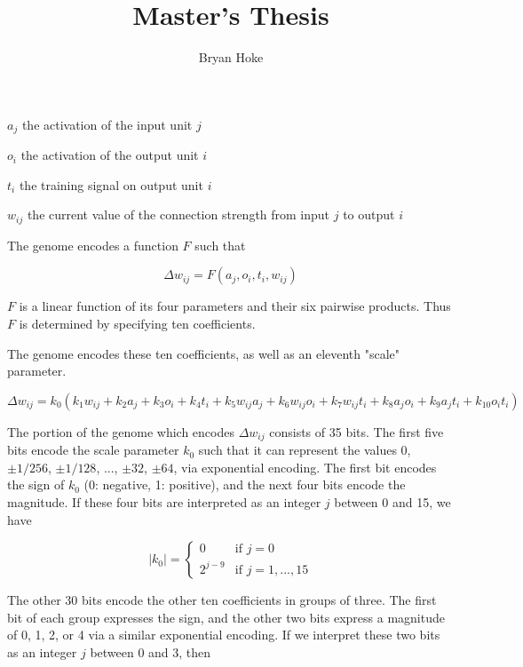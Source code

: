 \documentclass[master]{outhesis}
\title{Master's Thesis}
\author{Bryan Hoke}
\begin{document}
\makefrontmatter


\begin{center}
	$a_j$ the activation of the input unit $j$
\end{center}

\begin{center}
	$o_i$ the activation of the output unit $i$
\end{center}

\begin{center}
	$t_i$ the training signal on output unit $i$
\end{center}

\begin{center}
	$w_{ij}$ the current value of the connection strength from input $j$ to output $i$
\end{center}

The genome encodes a function $F$ such that

\[
	\Delta w_{ij} = F(a_j, o_i, t_i, w_{ij})
\]

$F$ is a linear function of its four parameters and their six pairwise products. Thus $F$ is determined by specifying ten coefficients.

The genome encodes these ten coefficients, as well as an eleventh "scale" parameter.

\[
	\Delta w_{ij} = k_0(k_1w_{ij}+k_2a_j+k_3o_i+k_4t_i+k_5w_{ij}a_j+k_6w_{ij}o_i+k_7w_{ij}t_{i}+k_8a_jo_i+k_9a_jt_i+k_{10}o_it_i)
\]

The portion of the genome which encodes $\Delta w_{ij}$ consists of 35 bits. The first five bits encode the scale parameter $k_0$ such that it can represent the values $0$, $\pm 1/256$, $\pm 1/128$, ..., $\pm 32$, $\pm 64$, via exponential encoding. The first bit encodes the sign of $k_0$ (0: negative, 1: positive), and the next four bits encode the magnitude. If these four bits are interpreted as an integer $j$ between 0 and 15, we have

\[
	|k_0|=
	\begin{cases}
		0 & \text{if $j = 0$}\\
		2^{j-9} & \text{if $j = 1, ..., 15$}
	\end{cases}
\]

The other 30 bits encode the other ten coefficients in groups of three. The first bit of each group expresses the sign, and the other two bits express a magnitude of 0, 1, 2, or 4 via a similar exponential encoding. If we interpret these two bits as an integer $j$ between 0 and 3, then
\end{document}
